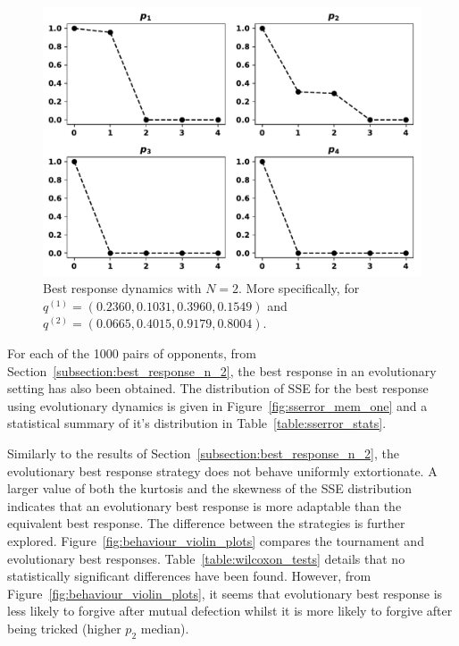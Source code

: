 \documentclass[10pt]{article}
\begin{document}
\begin{figure}[!htbp]
    \centering
    \includegraphics[width=.6\textwidth]{img/evolution_example_two.pdf}
    \caption{Best response dynamics with \(N=2\). More specifically, for
    \(q ^{(1)}=(0.2360,
                0.1031,
                0.3960,
                0.1549)\) and
    \(q ^{(2)}=(0.0665,
                0.4015,
                0.9179,
                0.8004)\).}
\label{fig:best_response_dynamics_results}
\end{figure}

For each of the 1000 pairs of opponents, from
Section~\ref{subsection:best_response_n_2}, the best response in an evolutionary
setting has also been obtained. The distribution of SSE for the best response
using evolutionary dynamics is given in Figure~\ref{fig:sserror_mem_one} and a
statistical summary of it's distribution in Table~\ref{table:sserror_stats}.

Similarly to the results of Section~\ref{subsection:best_response_n_2}, the
evolutionary best response strategy does not behave uniformly extortionate. A
larger value of both the kurtosis and the skewness of the SSE distribution
indicates that an evolutionary best response is more adaptable than the
equivalent best response. The difference between the strategies is further
explored. Figure~\ref{fig:behaviour_violin_plots} compares the tournament and
evolutionary best responses.
Table~\ref{table:wilcoxon_tests} details that no statistically significant
differences have been found. However, from
Figure~\ref{fig:behaviour_violin_plots}, it seems that evolutionary best
response is less likely to forgive after mutual defection whilst it is more
likely to forgive after being tricked (higher $p_2$ median).
\end{document}
